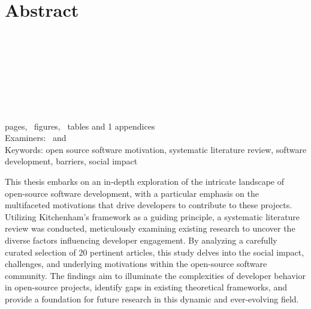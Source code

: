 \section*{Abstract}
\begin{spacing}{1.5}
    \university\\
    \school\\
    \degreeprogramme\\
\end{spacing}

\myname

\textbf{\mytitle}\\
\mysubtitle

\begin{spacing}{1.5}
    \thesistype\\
    \thesisyear\\
    \pageref{myLastPage} pages, \totalfigures~figures, \totaltables~tables and 1 appendices\\
    Examiners: \examinerA~and \examinerB\\
    Keywords: open source software motivation, systematic literature review, software development, barriers, social impact
\end{spacing}

\vspace{1em}
\begin{spacing}{1.0}

    This thesis embarks on an in-depth exploration of the intricate landscape of open-source software development, with a particular emphasis on the multifaceted motivations that drive developers to contribute to these projects. Utilizing Kitchenham's framework as a guiding principle, a systematic literature review was conducted, meticulously examining existing research to uncover the diverse factors influencing developer engagement. By analyzing a carefully curated selection of 20 pertinent articles, this study delves into the social impact, challenges, and underlying motivations within the open-source software community. The findings aim to illuminate the complexities of developer behavior in open-source projects, identify gaps in existing theoretical frameworks, and provide a foundation for future research in this dynamic and ever-evolving field.

\end{spacing}
\clearpage %
